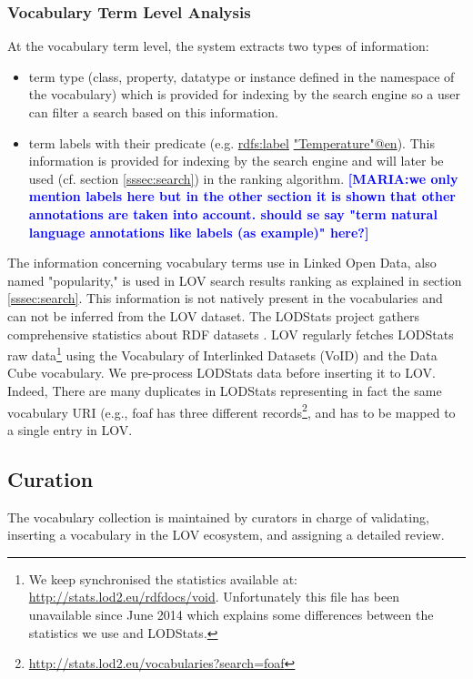 \documentclass{iosart2c}
\newcommand{\maria}[1]{\textcolor{blue}{\textbf{[MARIA:#1]}}}
\begin{document}
\subsubsection{Vocabulary Term Level Analysis}
At the vocabulary term level, the system extracts two types of information:
\begin{itemize}
\item term type (class, property, datatype or instance defined in the namespace of the vocabulary) which is provided for indexing by the search engine so a user can filter a search based on this information.
\item term labels with their predicate (e.g. \url{rdfs:label} \url{"Temperature"@en}). This information is provided for indexing by the search engine and will later be used (cf. section \ref{sssec:search}) in the ranking algorithm. \maria{we only mention labels here but in the other section it is shown that other annotations are taken into account. should se say "term natural language annotations like labels (as example)" here?}
\end{itemize}

The information concerning vocabulary terms use in Linked Open Data, also named "popularity," is used in LOV search results ranking as explained in section \ref{sssec:search}. This information is not natively present in the vocabularies and can not be inferred from the LOV dataset. The LODStats project gathers comprehensive statistics about RDF datasets \cite{demter-2012-ekaw}. LOV regularly fetches LODStats raw data\footnote{We keep synchronised the statistics available at: \url{http://stats.lod2.eu/rdfdocs/void}. Unfortunately this file has been unavailable since June 2014 which explains some differences between the statistics we use and LODStats.} using the Vocabulary of Interlinked Datasets (VoID) \cite{void2009} and the Data Cube vocabulary. We pre-process LODStats data before inserting it to LOV. Indeed, There are many duplicates in LODStats representing in fact the same vocabulary URI (e.g., foaf has three different records\footnote{\url{http://stats.lod2.eu/vocabularies?search=foaf}}, and has to be mapped to a single entry in LOV.

\subsection{Curation}
The vocabulary collection is maintained by curators in charge of validating, inserting a vocabulary in the LOV ecosystem, and assigning a detailed review.
\end{document}
